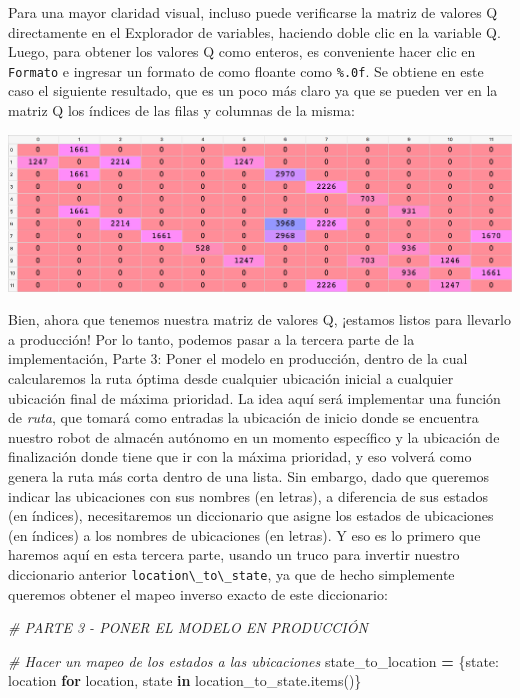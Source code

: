 \documentclass[
]{book}
\newenvironment{Shaded}{\begin{snugshade}}{\end{snugshade}}
\newcommand{\CommentTok}[1]{\textcolor[rgb]{0.56,0.35,0.01}{\textit{#1}}}
\newcommand{\ControlFlowTok}[1]{\textcolor[rgb]{0.13,0.29,0.53}{\textbf{#1}}}
\newcommand{\KeywordTok}[1]{\textcolor[rgb]{0.13,0.29,0.53}{\textbf{#1}}}
\newcommand{\NormalTok}[1]{#1}
\newcommand{\OperatorTok}[1]{\textcolor[rgb]{0.81,0.36,0.00}{\textbf{#1}}}
\begin{document}
Para una mayor claridad visual, incluso puede verificarse la matriz de valores Q directamente en el Explorador de variables, haciendo doble clic en la variable Q. Luego, para obtener los valores Q como enteros, es conveniente hacer clic en \texttt{Formato} e ingresar un formato de como floante como \texttt{\%.0f}. Se obtiene en este caso el siguiente resultado, que es un poco más claro ya que se pueden ver en la matriz Q los índices de las filas y columnas de la misma:

\includegraphics{Images/Q_Values_Variable_Explorer.png}

Bien, ahora que tenemos nuestra matriz de valores Q, ¡estamos listos para llevarlo a producción! Por lo tanto, podemos pasar a la tercera parte de la implementación, Parte 3: Poner el modelo en producción, dentro de la cual calcularemos la ruta óptima desde cualquier ubicación inicial a cualquier ubicación final de máxima prioridad. La idea aquí será implementar una función de \emph{ruta}, que tomará como entradas la ubicación de inicio donde se encuentra nuestro robot de almacén autónomo en un momento específico y la ubicación de finalización donde tiene que ir con la máxima prioridad, y eso volverá como genera la ruta más corta dentro de una lista. Sin embargo, dado que queremos indicar las ubicaciones con sus nombres (en letras), a diferencia de sus estados (en índices), necesitaremos un diccionario que asigne los estados de ubicaciones (en índices) a los nombres de ubicaciones (en letras). Y eso es lo primero que haremos aquí en esta tercera parte, usando un truco para invertir nuestro diccionario anterior \texttt{location\textbackslash{}\_to\textbackslash{}\_state}, ya que de hecho simplemente queremos obtener el mapeo inverso exacto de este diccionario:

\begin{Shaded}
\begin{Highlighting}[]
\CommentTok{\# PARTE 3 {-} PONER EL MODELO EN PRODUCCIÓN}

\CommentTok{\# Hacer un mapeo de los estados a las ubicaciones}
\NormalTok{state\_to\_location }\OperatorTok{=}\NormalTok{ \{state: location }
                      \ControlFlowTok{for}\NormalTok{ location, state }\KeywordTok{in}\NormalTok{ location\_to\_state.items()\}}
\end{Highlighting}
\end{Shaded}
\end{document}
